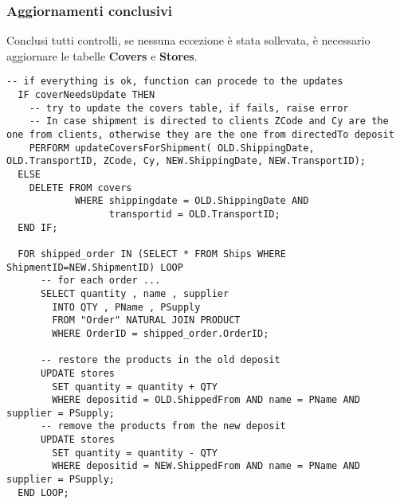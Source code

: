\subsubsection{Aggiornamenti conclusivi}

Conclusi tutti controlli, se nessuna eccezione è stata sollevata, è necessario aggiornare le tabelle \textbf{Covers} e \textbf{Stores}.

\begin{lstlisting}[caption={Sezione di aggiornamento finale}]
  -- if everything is ok, function can procede to the updates
  IF coverNeedsUpdate THEN
    -- try to update the covers table, if fails, raise error
    -- In case shipment is directed to clients ZCode and Cy are the one from clients, otherwise they are the one from directedTo deposit
    PERFORM updateCoversForShipment( OLD.ShippingDate, OLD.TransportID, ZCode, Cy, NEW.ShippingDate, NEW.TransportID);
  ELSE 
    DELETE FROM covers 
            WHERE shippingdate = OLD.ShippingDate AND 
                  transportid = OLD.TransportID;
  END IF;

  FOR shipped_order IN (SELECT * FROM Ships WHERE ShipmentID=NEW.ShipmentID) LOOP
      -- for each order ...
      SELECT quantity , name , supplier 
        INTO QTY , PName , PSupply
        FROM "Order" NATURAL JOIN PRODUCT
        WHERE OrderID = shipped_order.OrderID;

      -- restore the products in the old deposit
      UPDATE stores
        SET quantity = quantity + QTY
        WHERE depositid = OLD.ShippedFrom AND name = PName AND supplier = PSupply;
      -- remove the products from the new deposit
      UPDATE stores
        SET quantity = quantity - QTY
        WHERE depositid = NEW.ShippedFrom AND name = PName AND supplier = PSupply;
  END LOOP;
\end{lstlisting}

